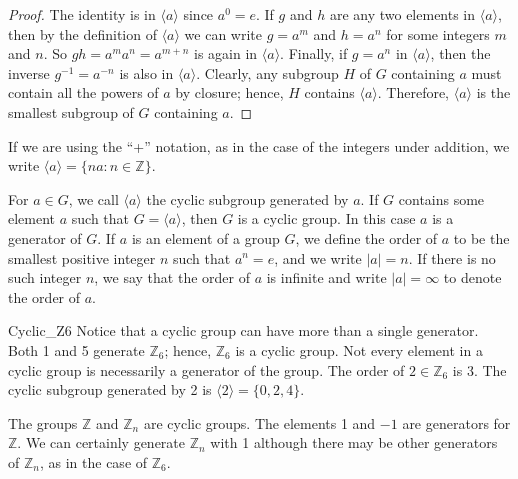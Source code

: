  
\begin{proof}
The identity is in $\langle a \rangle $ since $a^0 = e$. If $g$ and
$h$ are any two elements in $\langle a \rangle $, then by the
definition of $\langle a \rangle$ we can write $g = a^m$ and $h = a^n$
for some integers $m$ and $n$. So $gh = a^m a^n = a^{m+n}$ is again in
$\langle a \rangle $. Finally, if $g = a^n$ in $\langle a \rangle $,
then the inverse $g^{-1} = a^{-n}$ is also in $\langle a \rangle $.
Clearly, any subgroup $H$ of $G$ containing $a$ must contain all the
powers of $a$ by closure; hence, $H$ contains $\langle a \rangle $.
Therefore, $\langle a \rangle $ is the smallest subgroup of $G$
containing $a$. 
\end{proof}
 
 
\medskip
 
 
If we are using the ``+'' notation, as in the case of the integers under
addition, we write $\langle a \rangle  = \{ na : n \in {\mathbb Z} \}$.
 
 
\medskip
 
 
For $a \in G$, we call $\langle a \rangle $ the {\bfi cyclic
subgroup\/} generated by $a$. If $G$ contains
some element $a$ such that $G = \langle a \rangle $, then $G$ is a
{\bfi cyclic group}. In this case $a$ is a {\bfi
generator\/} of $G$.  If $a$ is an
element of a group $G$, we define the {\bfi order} of $a$ to be the smallest positive integer $n$ such that $a^n= e$,
and we write $|a| = n$\label{noteelementorder}. If there is no such
integer $n$, we say that the order of $a$ is infinite and  write $|a|
= \infty$ to denote the order of $a$.
 
 
\begin{example}{Cyclic_Z6}
Notice that a cyclic group can have more than a single
generator. Both 1 and 5 generate ${\mathbb Z}_6$; hence, ${\mathbb Z}_6$ is
a cyclic group. Not every element in a cyclic group is necessarily a
generator of the group. The order of $2 \in {\mathbb Z}_6$ is 3. The
cyclic subgroup generated by 2 is $\langle 2 \rangle  = \{ 0, 2, 4
\}$.  
\end{example}
 
 
The groups ${\mathbb Z}$ and ${\mathbb Z}_n$ are cyclic groups. The elements
1 and $-1$ are generators for ${\mathbb Z}$.  We can certainly generate
${\mathbb Z}_n$ with 1 although there may be other generators of ${\mathbb
Z}_n$, as in the case of ${\mathbb Z}_6$. 
 
